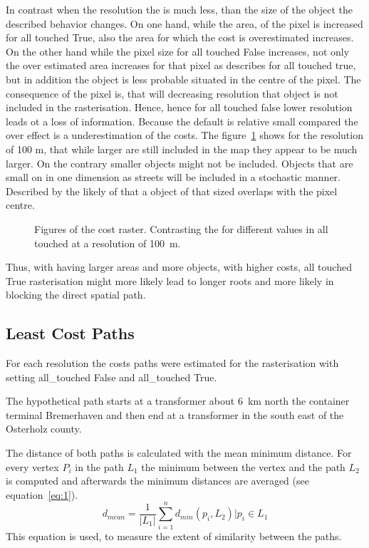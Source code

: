In contrast when the resolution the is much less, than the size of the object the described behavior changes.
On one hand, while the area, of the pixel is increased for all touched True, also the area for which the cost is overestimated increases.
On the other hand while the pixel size for all touched  False increases, not only the over estimated area increases for that pixel as describes for all touched true, but in addition the object is less probable situated in the centre of the pixel.
The consequence of the pixel is, that will decreasing resolution that object is not included in the rasterisation.
Hence, hence for all touched false lower resolution  leads ot a loss of information.
Because the default is relative small compared the over effect is a underestimation of the costs.
The figure~\ref{fig:costs_100m} shows for the resolution of 100 m, that while larger are still included in the map they appear to be much larger.
On the contrary smaller objects might not be included.
Objects that are small on in one dimension as streets will be included in a stochastic manner.
Described by the likely of that a object of that sized overlaps with the pixel centre.
\begin{figure}
	\centering

	\qquad
	\caption{Figures of the cost raster. Contrasting the for different values in all touched at a resolution of 100~m.}
	\label{fig:costs_100m}
\end{figure}
Thus, with having larger areas and more objects, with higher costs, all touched True rasterisation might more likely lead to longer roots and more likely in blocking the  direct spatial path.

\subsection{Least Cost Paths}\label{subsec:least-cost-paths}
For each resolution the costs paths were estimated for the rasterisation with setting all\_touched False
and all\_touched True.

The hypothetical path starts at a transformer about 6~km north the container terminal Bremerhaven and then end at a transformer in the south east of the Osterholz county. 

The distance of both paths is calculated with the mean minimum distance.
For every vertex $P_i$ in the path $L_1$ the minimum between the vertex and the path $L_2$
is computed and afterwards the minimum distances are averaged (see equation~\ref{eq:1}).
\begin{equation}
	\label{eq:1}
	d_{mean} = \frac{1}{|L_1|} \sum_{i=1}^{n} d_{min}(p_i, L_2) \bigg\vert p_i \in L_1
\end{equation}
This equation is used, to measure the extent of similarity between the paths.

